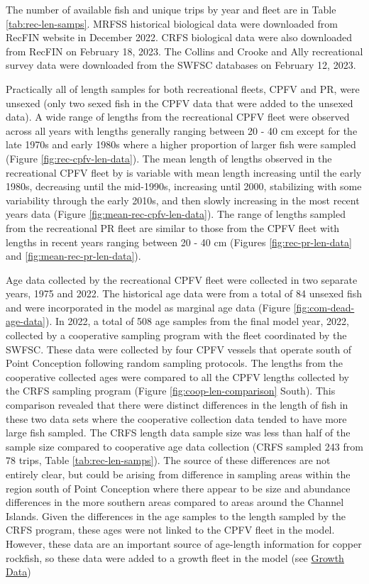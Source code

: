 \documentclass[11pt,
  english,
  letterpaper,
]{article}
\begin{document}
The number of available fish and unique trips by year and fleet are in Table \ref{tab:rec-len-samps}. MRFSS historical biological data were downloaded from RecFIN website in December 2022. CRFS biological data were also downloaded from RecFIN on February 18, 2023. The Collins and Crooke and Ally recreational survey data were downloaded from the SWFSC databases on February 12, 2023.

Practically all of length samples for both recreational fleets, CPFV and PR, were unsexed (only two sexed fish in the CPFV data that were added to the unsexed data). A wide range of lengths from the recreational CPFV fleet were observed across all years with lengths generally ranging between 20 - 40 cm except for the late 1970s and early 1980s where a higher proportion of larger fish were sampled (Figure \ref{fig:rec-cpfv-len-data}). The mean length of lengths observed in the recreational CPFV fleet by is variable with mean length increasing until the early 1980s, decreasing until the mid-1990s, increasing until 2000, stabilizing with some variability through the early 2010s, and then slowly increasing in the most recent years data (Figure \ref{fig:mean-rec-cpfv-len-data}). The range of lengths sampled from the recreational PR fleet are similar to those from the CPFV fleet with lengths in recent years ranging between 20 - 40 cm (Figures \ref{fig:rec-pr-len-data} and \ref{fig:mean-rec-pr-len-data}).

Age data collected by the recreational CPFV fleet were collected in two separate years, 1975 and 2022. The historical age data were from a total of 84 unsexed fish and were incorporated in the model as marginal age data (Figure \ref{fig:com-dead-age-data}). In 2022, a total of 508 age samples from the final model year, 2022, collected by a cooperative sampling program with the fleet coordinated by the SWFSC. These data were collected by four CPFV vessels that operate south of Point Conception following random sampling protocols. The lengths from the cooperative collected ages were compared to all the CPFV lengths collected by the CRFS sampling program (Figure \ref{fig:coop-len-comparison} South). This comparison revealed that there were distinct differences in the length of fish in these two data sets where the cooperative collection data tended to have more large fish sampled. The CRFS length data sample size was less than half of the sample size compared to cooperative age data collection (CRFS sampled 243 from 78 trips, Table \ref{tab:rec-len-samps}). The source of these differences are not entirely clear, but could be arising from difference in sampling areas within the region south of Point Conception where there appear to be size and abundance differences in the more southern areas compared to areas around the Channel Islands. Given the differences in the age samples to the length sampled by the CRFS program, these ages were not linked to the CPFV fleet in the model. However, these data are an important source of age-length information for copper rockfish, so these data were added to a growth fleet in the model (see \protect\hyperlink{growth-data}{Growth Data})
\end{document}
